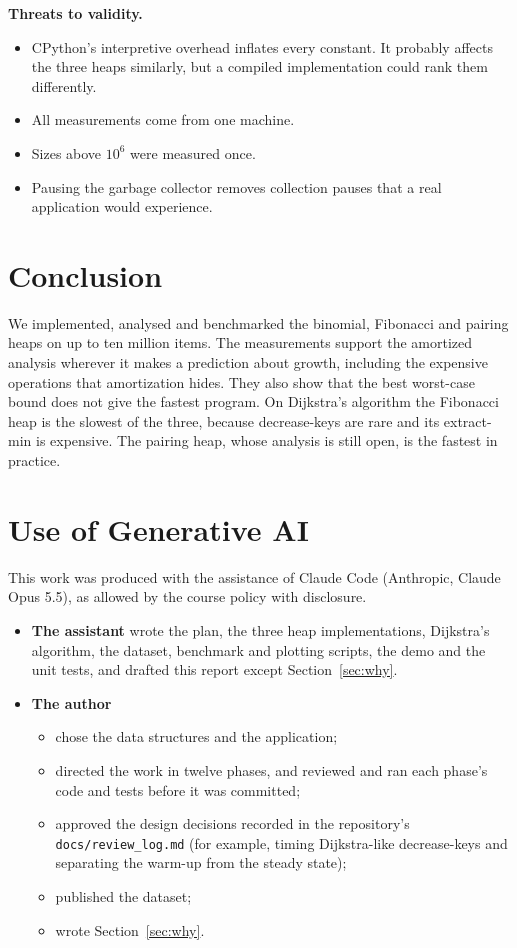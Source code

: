 \documentclass[acmsmall,nonacm]{acmart}
\newcommand{\code}[1]{\texttt{#1}}
\begin{document}
\textbf{Threats to validity.}
\begin{itemize}
  \item CPython's interpretive overhead inflates every constant. It probably affects the three heaps similarly, but a compiled implementation could rank them differently.
  \item All measurements come from one machine.
  \item Sizes above $10^6$ were measured once.
  \item Pausing the garbage collector removes collection pauses that a real application would experience.
\end{itemize}

\section{Conclusion}

We implemented, analysed and benchmarked the binomial, Fibonacci and pairing
heaps on up to ten million items. The measurements support the amortized
analysis wherever it makes a prediction about growth, including the expensive
operations that amortization hides. They also show that the best worst-case
bound does not give the fastest program. On Dijkstra's algorithm the Fibonacci
heap is the slowest of the three, because decrease-keys are rare and its
extract-min is expensive. The pairing heap, whose analysis is still open, is
the fastest in practice.

\section*{Use of Generative AI}

This work was produced with the assistance of Claude Code (Anthropic, Claude
Opus 5.5), as allowed by the course policy with disclosure.
\begin{itemize}
  \item \textbf{The assistant} wrote the plan, the three heap implementations, Dijkstra's algorithm, the dataset, benchmark and plotting scripts, the demo and the unit tests, and drafted this report except Section~\ref{sec:why}.
  \item \textbf{The author}
  \begin{itemize}
    \item chose the data structures and the application;
    \item directed the work in twelve phases, and reviewed and ran each phase's code and tests before it was committed;
    \item approved the design decisions recorded in the repository's \code{docs/review\_log.md} (for example, timing Dijkstra-like decrease-keys and separating the warm-up from the steady state);
    \item published the dataset;
    \item wrote Section~\ref{sec:why}.
  \end{itemize}
\end{itemize}



\end{document}
